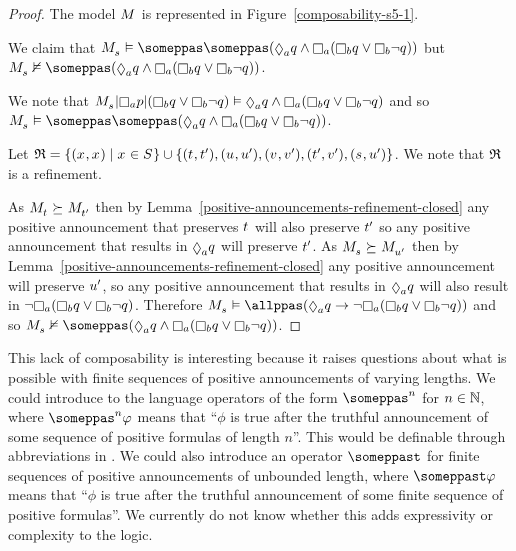 \begin{proof}
The model $\kModel$ is represented in Figure~\ref{composability-s5-1}.

We claim that $\kPModel{\kStateS} \entails \someppas \someppas (\suspects[\agentA] \atomQ \land \knows[\agentA] (\knows[\agentB] \atomQ \lor \knows[\agentB] \neg \atomQ))$ but $\kPModel{\kStateS} \nentails \someppas (\suspects[\agentA] \atomQ \land \knows[\agentA] (\knows[\agentB] \atomQ \lor \knows[\agentB] \neg \atomQ))$.

We note that $\restrict{\restrict{\kPModel{\kStateS}}{\knows[\agentA] \atomP}}{(\knows[\agentB] \atomQ \lor \knows[\agentB] \neg \atomQ)} \entails \suspects[\agentA] \atomQ \land \knows[\agentA] (\knows[\agentB] \atomQ \lor \knows[\agentB] \neg \atomQ)$ and so $\kPModel{\kStateS} \entails \someppas \someppas (\suspects[\agentA] \atomQ \land \knows[\agentA] (\knows[\agentB] \atomQ \lor \knows[\agentB] \neg \atomQ))$.

Let $\refinement = \{(\kStateX, \kStateX) \mid \kStateX \in \kStates\} \cup \{(\kStateT, \kStateT[\prime]), (\kStateU, \kStateU[\prime]), (\kStateV, \kStateV[\prime]), (\kStateT[\prime], \kStateV[\prime]), (\kStateS, \kStateU[\prime])\}$. 
We note that $\refinement$ is a refinement.

As $\kPModel{\kStateT} \simulates \kPModel{\kStateT[\prime]}$ then by Lemma~\ref{positive-announcements-refinement-closed} any positive announcement that preserves $\kStateT$ will also preserve $\kStateT[\prime]$ so any positive announcement that results in $\suspects[\agentA] \atomQ$ will preserve $\kStateT[\prime]$.
As $\kPModel{\kStateS} \simulates \kPModel{\kStateU[\prime]}$ then by Lemma~\ref{positive-announcements-refinement-closed} any positive announcement will preserve $\kStateU[\prime]$, so any positive announcement that results in $\suspects[\agentA] \atomQ$ will also result in $\neg \knows[\agentA] (\knows[\agentB] \atomQ \lor \knows[\agentB] \neg \atomQ)$.
Therefore $\kPModel{\kStateS} \entails \allppas (\suspects[\agentA] \atomQ \implies \neg \knows[\agentA] (\knows[\agentB] \atomQ \lor \knows[\agentB] \neg \atomQ))$ and so $\kPModel{\kStateS} \nentails \someppas (\suspects[\agentA] \atomQ \land \knows[\agentA] (\knows[\agentB] \atomQ \lor \knows[\agentB] \neg \atomQ))$.
\end{proof}

This lack of composability is interesting because it raises questions about what is possible with finite sequences of positive announcements of varying lengths.
We could introduce to the language operators of the form $\someppas^n$ for $n \in \naturals$, where $\someppas^n \phi$ means that ``$\phi$ is true after the truthful announcement of some sequence of positive formulas of length $n$''.
This would be definable through abbreviations in \langPapal{}.
We could also introduce an operator $\someppast$ for finite sequences of positive announcements of unbounded length, where $\someppast \phi$ means that ``$\phi$ is true after the truthful announcement of some finite sequence of positive formulas''.
We currently do not know whether this adds expressivity or complexity to the logic.

